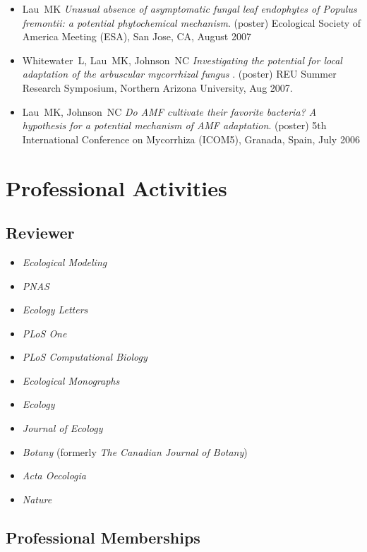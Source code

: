 \documentclass[a4paper]{article}
\begin{document}
\begin{itemize}
{  host species fidelity in woody plants of Arizona riparian forests.}
  Ecological Society of America Meeting (ESA), Milwaukee, WI, August
  2008
\item
  Lau~MK \emph{Unusual absence of asymptomatic fungal leaf endophytes of
  Populus fremontii: a potential phytochemical mechanism}. (poster)
  Ecological Society of America Meeting (ESA), San Jose, CA, August 2007
\item
  Whitewater~L, Lau~MK, Johnson~NC \emph{Investigating the potential for
  local adaptation of the arbuscular mycorrhizal fungus} . (poster) REU
  Summer Research Symposium, Northern Arizona University, Aug 2007.
\item
  Lau~MK, Johnson~NC \emph{Do AMF cultivate their favorite bacteria? A
  hypothesis for a potential mechanism of AMF adaptation}. (poster) 5th
  International Conference on Mycorrhiza (ICOM5), Granada, Spain, July
  2006

\end{itemize}

\section{Professional Activities}\label{professional-activities}

\subsection{Reviewer}\label{article-reviewer}

\begin{itemize}
\item
  \emph{Ecological Modeling}
\item
  \emph{PNAS}
\item
  \emph{Ecology Letters}
\item
  \emph{PLoS One}
\item
  \emph{PLoS Computational Biology}
\item
  \emph{Ecological Monographs}
\item
  \emph{Ecology}
\item
  \emph{Journal of Ecology}
\item
  \emph{Botany} (formerly \emph{The Canadian Journal of Botany})
\item
  \emph{Acta Oecologia}
\item
  \emph{Nature}
\end{itemize}

\subsection{Professional Memberships}\label{professional-memberships}
\end{document}
